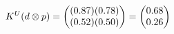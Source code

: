 \documentclass[preview]{standalone}
\begin{document}
\begin{align*}
\special{dvisvgm:raw <g id='unique000'>}K^U(d \otimes p) = \begin{pmatrix} (0.87)(0.78) \\ (0.52)(0.50) \end{pmatrix} = \begin{pmatrix} 0.68 \\ 0.26 \end{pmatrix}\special{dvisvgm:raw </g>}
\end{align*}
\end{document}
